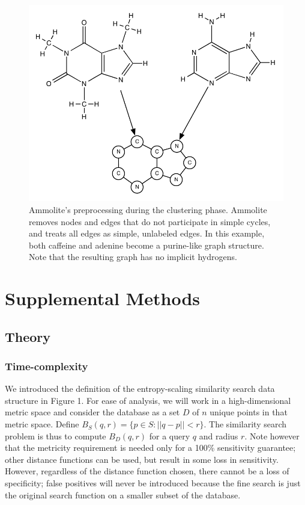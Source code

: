 \documentclass[review,preprint,12pt]{elsarticle}
\theoremstyle{definition}
\theoremstyle{remark}
\begin{document}
\begin{figure}[hbp]
    \centering
    \includegraphics[width=1\textwidth]{assets/ammolite-simplification.pdf}
    \caption{ Ammolite's preprocessing during the clustering phase. Ammolite 
    removes nodes and edges that do not participate in simple cycles, and 
    treats all edges as simple, unlabeled edges. In this example, both caffeine 
    and adenine become a purine-like graph structure. Note that the resulting 
    graph has no implicit hydrogens.
    }
    \label{fig:ammolite}
\end{figure}

\section{Supplemental Methods}

\subsection{Theory}
\subsubsection{Time-complexity}
We introduced the definition of the entropy-scaling similarity search data structure in Figure 1.
For ease of analysis, we will work in a high-dimensional metric space and consider the database as a set $D$ of $n$ unique points in that metric space.
Define $B_S(q,r) = \{ p \in S : ||q-p||<r \}$. The similarity search problem is thus to compute $B_D(q,r)$ for a query $q$ and radius $r$.
Note however that the metricity requirement is needed only for a 100\% sensitivity guarantee; other distance functions can be used, but result in some loss in sensitivity.
However, regardless of the distance function chosen, there cannot be a loss of
specificity; false positives will never be introduced because the fine search is just the original search function on a smaller subset of the database.
\end{document}
